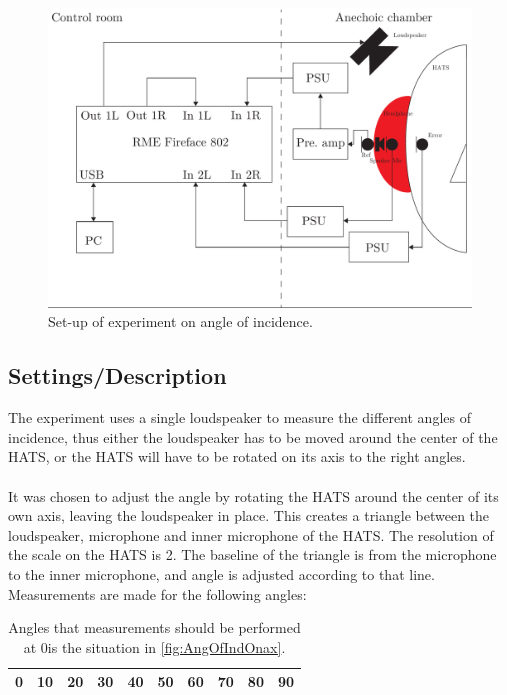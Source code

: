 \begin{figure}[h]
	\centering
	\includegraphics[width=\textwidth]{../Journal/Experiments/AngleOfIncidence/AngleOfIncidenceSetup.pdf}
	\caption{Set-up of experiment on angle of incidence.}
	\label{Fig:AngleOfIncidenceSetup}
\end{figure}



\subsection{Settings/Description}\label{sec:AngleDescription}
The experiment uses a single loudspeaker to measure the  different angles of incidence, thus either the loudspeaker has to be moved around the center of the HATS, or the HATS will have to be rotated on its axis to the right angles. \\\\
It was chosen to adjust the angle by rotating the HATS around the center of its own axis, leaving the loudspeaker in place. This creates a triangle between the loudspeaker, microphone and inner microphone of the HATS. The resolution of the scale on the HATS is 2\degrees. The baseline of the triangle is from the microphone to the inner microphone, and angle is adjusted according to that line.
Measurements are made for the following angles:
\begin{table}[H]
	\centering
	\begin{tabular}{c c c c c c c c c c} \toprule
		0\degrees & 10\degrees & 20\degrees & 30\degrees & 40\degrees & 50\degrees & 60\degrees & 70\degrees & 80\degrees & 90\degrees \\ \bottomrule
	\end{tabular}
\caption{Angles that measurements should be performed at 0\degrees  is the situation in \autoref{fig:AngOfIndOnax}.}
\label{Tab:AngleOfInciMeasAngles}
\end{table}
 

